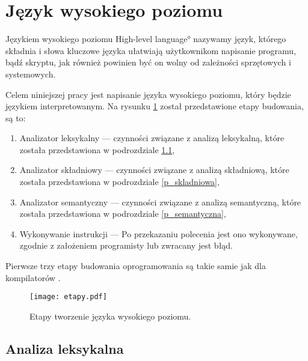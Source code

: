 \section{Język wysokiego poziomu }

Językiem wysokiego poziomu \ang{High-level language} nazywamy język, 
którego składnia i słowa kluczowe języka ułatwiają użytkownikom  napisanie programu, bądź skryptu,
jak również powinien być on wolny od zależności sprzętowych i systemowych.

Celem niniejszej pracy jest napisanie języka wysokiego poziomu, który będzie językiem interpretowanym.
Na rysunku \ref{fig:etapy} został przedstawione etapy budowania, są to:
\begin{enumerate}
 \item Analizator leksykalny  --- czynności związane z analizą leksykalną, które  została przedstawiona w podrozdziale  \ref{p_leksykalna},
 \item Analizator składniowy  --- czynności związane z analizą składniową, które  została przedstawiona w podrozdziale  \ref{p_skladniowa},
 \item Analizator semantyczny --- czynności związane z analizą semantyczną, które  została przedstawiona w podrozdziale \ref{p_semantyczna},
 \item Wykonywanie instrukcji --- Po przekazaniu polecenia jest ono wykonywane, zgodnie z założeniem programisty lub zwracany jest błąd.
\end{enumerate}
Pierwsze trzy etapy budowania oprogramowania są takie samie jak dla kompilatorów \cite{aho}.

 \begin{center}
\begin{figure}[H]
  \begin{center}
    \texttt{[image: etapy.pdf]}
  \end{center}
  \caption{Etapy tworzenie języka wysokiego poziomu. }
    \label{fig:etapy}
\end{figure}
\end{center}


\subsection{Analiza leksykalna} \label{p_leksykalna}

